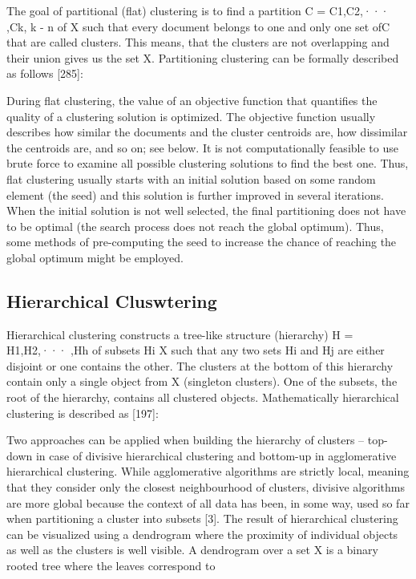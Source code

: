 \documentclass[11pt,openany,executivepaper]{book}
\begin{document}
The goal of partitional (flat) clustering is to find a partition C = {C1,C2,··· ,Ck},
k - n of X such that every document belongs to one and only one set ofC that are
called clusters. This means, that the clusters are not overlapping and their union
gives us the set X. Partitioning clustering can be formally described as follows
[285]:

During flat clustering, the value of an objective function that quantifies the
quality of a clustering solution is optimized. The objective function usually describes how similar the documents and the cluster centroids are, how dissimilar
the centroids are, and so on; see below.
It is not computationally feasible to use brute force to examine all possible
clustering solutions to find the best one. Thus, flat clustering usually starts with
an initial solution based on some random element (the seed) and this solution
is further improved in several iterations. When the initial solution is not well
selected, the final partitioning does not have to be optimal (the search process
does not reach the global optimum). Thus, some methods of pre-computing the
seed to increase the chance of reaching the global optimum might be employed.

\subsection{Hierarchical Cluswtering}
Hierarchical clustering constructs a tree-like structure (hierarchy) H =
{H1,H2,··· ,Hh} of subsets Hi X such that any two sets Hi and Hj are either
disjoint or one contains the other. The clusters at the bottom of this hierarchy
contain only a single object from X (singleton clusters). One of the subsets, the
root of the hierarchy, contains all clustered objects. Mathematically hierarchical
clustering is described as [197]:

Two approaches can be applied when building the hierarchy of clusters –
top-down in case of divisive hierarchical clustering and bottom-up in agglomerative hierarchical clustering. While agglomerative algorithms are strictly local,
meaning that they consider only the closest neighbourhood of clusters, divisive
algorithms are more global because the context of all data has been, in some way,
used so far when partitioning a cluster into subsets [3].
The result of hierarchical clustering can be visualized using a dendrogram
where the proximity of individual objects as well as the clusters is well visible.
A dendrogram over a set X is a binary rooted tree where the leaves correspond to
\end{document}
